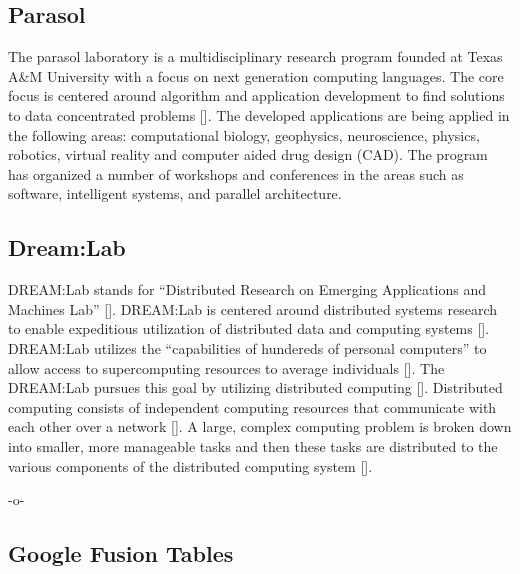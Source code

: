 \subsection{Parasol}

The parasol laboratory is a multidisciplinary research program founded
at Texas A\&M University with a focus on next generation computing
languages.  The core focus is centered around algorithm and
application development to find solutions to data concentrated
problems [\cite{www-parasol}]. The developed applications are being
applied in the following areas: computational biology, geophysics,
neuroscience, physics, robotics, virtual reality and computer aided
drug design (CAD).  The program has organized a number of workshops
and conferences in the areas such as software, intelligent systems,
and parallel architecture.
    
\subsection{Dream:Lab}

DREAM:Lab stands for ``Distributed Research on Emerging Applications
and Machines Lab'' [\cite{dream}]. DREAM:Lab is centered around
distributed systems research to enable expeditious utilization of
distributed data and computing systems [\cite{dream}]. DREAM:Lab
utilizes the ``capabilities of hundereds of personal computers'' to
allow access to supercomputing resources to average
individuals [\cite{rao}]. The DREAM:Lab pursues this goal by utilizing
distributed computing [\cite{rao}].  Distributed computing consists of
independent computing resources that communicate with each other over
a network [\cite{denero}]. A large, complex computing problem is broken
down into smaller, more manageable tasks and then these tasks are
distributed to the various components of the distributed computing
system [\cite{denero}].

    -o-
    
\subsection{Google Fusion Tables}
    

